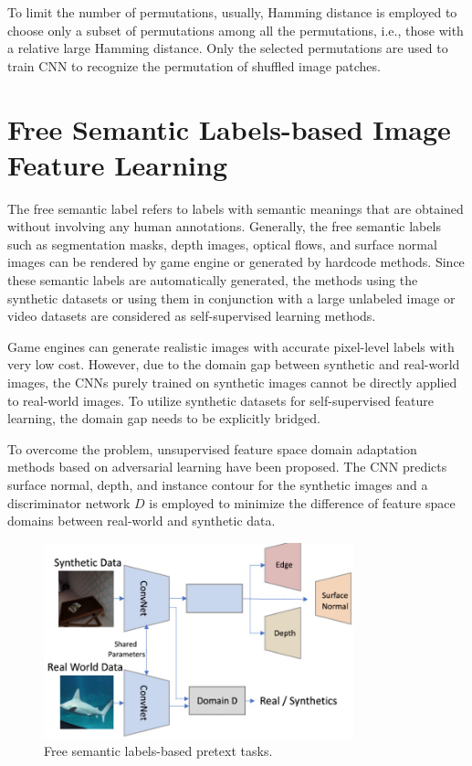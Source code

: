 To limit the number of permutations, usually, Hamming distance is employed to
choose only a subset of permutations among all the permutations, i.e., those
with a relative large Hamming distance. Only the selected permutations are used
to train CNN to recognize the permutation of shuffled image patches.

\section{Free Semantic Labels-based Image Feature Learning}
The free semantic label refers to labels with semantic meanings that are obtained
without involving any human annotations. Generally, the free semantic labels such
as segmentation masks, depth images, optical flows, and surface normal images can
be rendered by game engine or generated by hardcode methods. Since these semantic
labels are automatically generated, the methods using the synthetic datasets or
using them in conjunction with a large unlabeled image or video datasets are
considered as self-supervised learning methods.

Game engines can generate realistic images with accurate pixel-level labels with
very low cost. However, due to the domain gap between synthetic and real-world
images, the CNNs purely trained on synthetic images cannot be directly applied
to real-world images. To utilize synthetic datasets for self-supervised feature
learning, the domain gap needs to be explicitly bridged.

To overcome the problem, unsupervised feature space domain adaptation methods
based on adversarial learning have been proposed. The CNN predicts surface normal,
depth, and instance contour for the synthetic images and a discriminator network
$D$ is employed to minimize the difference of feature space domains between
real-world and synthetic data.

\begin{figure}[!ht]
      \centering
      \includegraphics[width=0.8\textwidth]{img/SSL/FreeSemantic.png}
      \caption{Free semantic labels-based pretext tasks.}
      \label{fig:FSL}
\end{figure}

